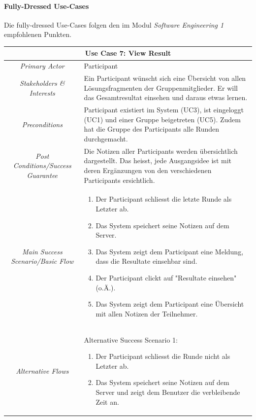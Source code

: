 \paragraph{Fully-Dressed Use-Cases}
Die fully-dressed Use-Cases folgen den im Modul \textit{Software Engineering 1} empfohlenen Punkten.
\renewcommand{\arraystretch}{1.35}
\begin{center}
	\begin{longtable}{| c | p{7cm} |}
		\hline
		\multicolumn{2}{|c|}{\textbf{Use Case 7: View Result}}\\
		\hline\hline
		\textit{Primary Actor} & Participant\\
		\hline
		\textit{Stakeholders \& Interests} & Ein Participant wünscht sich eine Übersicht von allen Lösungsfragmenten der Gruppenmitglieder. Er will das Gesamtresultat einsehen und daraus etwas lernen. \\
		\hline
		\textit{Preconditions} & Participant existiert im System (UC3), ist eingeloggt (UC1) und einer Gruppe beigetreten (UC5). Zudem hat die Gruppe des Participants alle Runden durchgemacht.\\
		\hline
		\textit{Post Conditions/Success Guarantee} & Die Notizen aller Participants werden übersichtlich dargestellt. Das heisst, jede Ausgangsidee ist mit deren Ergänzungen von den verschiedenen Participants ersichtlich.\\
		\hline
		\textit{Main Success Scenario/Basic Flow} & 
		\begin{enumerate}[noitemsep]
			\item Der Participant schliesst die letzte Runde als Letzter ab.
			\item Das System speichert seine Notizen auf dem Server.
			\item Das System zeigt dem Participant eine Meldung, dass die Resultate einsehbar sind.
			\item Der Participant clickt auf "Resultate einsehen" (o.Ä.).
			\item Das System zeigt dem Participant eine Übersicht mit allen Notizen der Teilnehmer.
		\end{enumerate}\\
		\hline
		\textit{Alternative Flows} &
		Alternative	Success Scenario 1:
		\begin{enumerate}[label=1.\alph*,noitemsep]
			\item Der Participant schliesst die Runde nicht als Letzter ab.
			\item Das System speichert seine Notizen auf dem Server und zeigt dem Benutzer die verbleibende Zeit an.

\end{enumerate}
\end{longtable}
\end{center}
